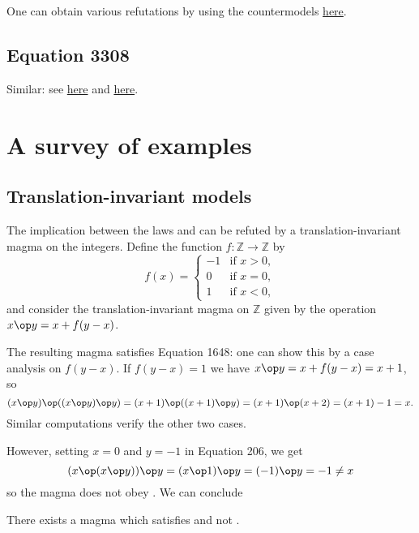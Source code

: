 One can obtain various refutations by using the countermodels \href{https://leanprover.zulipchat.com/#narrow/channel/458659-Equational/topic/713.2C.201289.2C.201447/near/483735768}{here}.
\subsection{Equation 3308}

Similar: see \href{https://leanprover.zulipchat.com/#narrow/channel/458659-Equational/topic/713.2C.201289.2C.201447/near/482066500}{here} and \href{https://leanprover.zulipchat.com/#narrow/channel/458659-Equational/topic/713.2C.201289.2C.201447/near/483735768}{here}.


\section{A survey of examples}\label{infinite-examples-section}

\subsection{Translation-invariant models}

The implication between the laws  and  can be refuted by a translation-invariant
magma on the integers. Define the function $f: \mathbb{Z} \to \mathbb{Z}$ by
$$f(x) =
\begin{cases}
  -1  & \text{if } x > 0, \\
   0  & \text{if } x = 0, \\
   1  & \text{if } x < 0,
\end{cases}$$
and consider the translation-invariant magma on $\mathbb{Z}$ given by the operation $x \op y = x + f(y-x)$.

The resulting magma satisfies Equation 1648: one can show this by a case analysis on $f(y-x)$. If $f(y-x)=1$ we have $x \op y = x + f(y-x) = x + 1$, so
$$(x \op y) \op ((x \op y) \op y) = (x + 1) \op ((x + 1) \op y) = (x + 1) \op (x + 2) = (x + 1) - 1 = x.$$
Similar computations verify the other two cases.

However, setting $x=0$ and $y=-1$ in Equation 206, we get
$$(x \op (x \op y)) \op y = (x \op 1) \op y = (-1) \op y = -1 \neq x$$
so the magma does not obey . We can conclude

\begin{theorem}\label{non_imp_1648_206_thm}
  \leanok
  There exists a magma which satisfies  and not .
\end{theorem}

